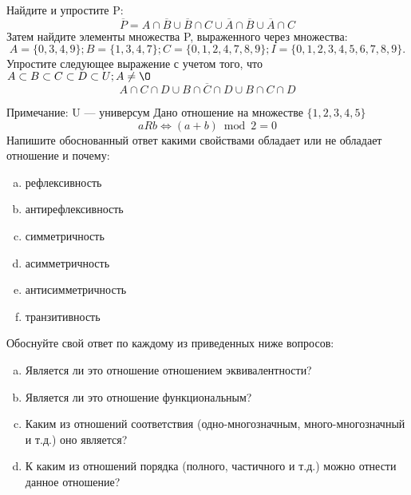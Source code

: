 \documentclass[10pt]{exam}
\begin{document}
\begin{questions}
\question
Найдите и упростите P:
\begin{equation*}
\overline{P} = A \cap \overline{B} \cup \overline{B} \cap C \cup \overline{A} \cap \overline{B} \cup \overline{A} \cap C
\end{equation*}
Затем найдите элементы множества P, выраженного через множества:
\begin{equation*}
A = \{0, 3, 4, 9\}; 
B = \{1, 3, 4, 7\};
C = \{0, 1, 2, 4, 7, 8, 9\};
I = \{0, 1, 2, 3, 4, 5, 6, 7, 8, 9\}.
\end{equation*}\question
Упростите следующее выражение с учетом того, что $A\subset B \subset C \subset D \subset U; A \neq \O$
\begin{equation*}
A \cap C  \cap D \cup B \cap \overline{C} \cap D \cup B \cap C \cap D
\end{equation*}

Примечание: U — универсум\question
Дано отношение на множестве $\{1, 2, 3, 4, 5\}$ 
\begin{equation*}
aRb \iff (a+b) \bmod 2 =0
\end{equation*}
Напишите обоснованный ответ какими свойствами обладает или не обладает отношение и почему:   
\begin{enumerate} [a)]\setcounter{enumi}{0}
\item рефлексивность
\item антирефлексивность
\item симметричность
\item асимметричность
\item антисимметричность
\item транзитивность
\end{enumerate}

Обоснуйте свой ответ по каждому из приведенных ниже вопросов:
\begin{enumerate} [a)]\setcounter{enumi}{0}
    \item Является ли это отношение отношением эквивалентности?
    \item Является ли это отношение функциональным?
    \item Каким из отношений соответствия (одно-многозначным, много-многозначный и т.д.) оно является?
    \item К каким из отношений порядка (полного, частичного и т.д.) можно отнести данное отношение?
\end{enumerate}




\end{questions}
\end{document}
